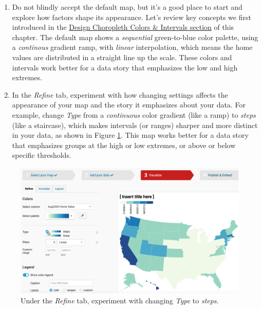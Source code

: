 \documentclass[
  english,
]{book}
\begin{document}
\begin{enumerate}
\def\labelenumi{\arabic{enumi}.}
\setcounter{enumi}{7}
\item
  Do not blindly accept the default map, but it's a good place to start and explore how factors shape its appearance. Let's review key concepts we first introduced in the \href{design-choropleth.html}{Design Choropleth Colors \& Intervals section} of this chapter. The default map shows a \emph{sequential} green-to-blue color palette, using a \emph{continous} gradient ramp, with \emph{linear} interpolation, which means the home values are distributed in a straight line up the scale. These colors and intervals work better for a data story that emphasizes the low and high extremes.
\item
  In the \emph{Refine} tab, experiment with how changing settings affects the appearance of your map and the story it emphasizes about your data. For example, change \emph{Type} from a \emph{continuous} color gradient (like a ramp) to \emph{steps} (like a staircase), which makes intervals (or ranges) sharper and more distinct in your data, as shown in Figure \ref{fig:datawrapper-default-steps}. This map works better for a data story that emphasizes groups at the high or low extremes, or above or below specific thresholds.
\end{enumerate}



\begin{figure}
\includegraphics[width=600px]{images/07-map/datawrapper-default-steps} \caption{Under the \emph{Refine} tab, experiment with changing \emph{Type} to \emph{steps}.}\label{fig:datawrapper-default-steps}
\end{figure}
\end{document}
